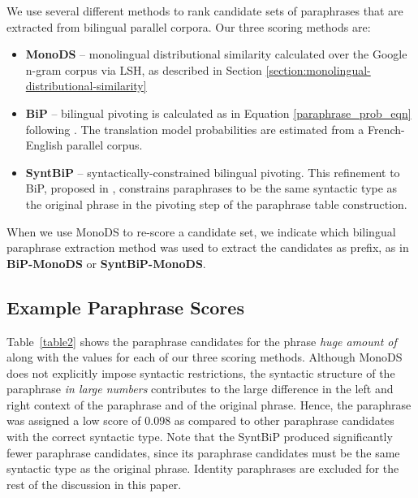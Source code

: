 \documentclass[11pt]{article}
\begin{document}
We use several different methods to rank candidate sets of paraphrases that are extracted from bilingual parallel corpora.  Our three scoring methods are: 
\begin{itemize}
\item {\bf MonoDS} -- monolingual distributional similarity calculated over the Google n-gram corpus via LSH,
 as described in Section \ref{section:monolingual-distributional-similarity}
\vspace{-.2cm}
\item {\bf BiP} -- bilingual pivoting is calculated as in Equation \ref{paraphrase_prob_eqn} following .  The translation model probabilities are estimated from a French-English parallel corpus.
\vspace{-.2cm}
\item {\bf SyntBiP} -- syntactically-constrained bilingual pivoting.  This refinement to BiP, proposed in  , constrains paraphrases to be the same syntactic type as the original phrase in the pivoting step of the paraphrase table construction.
\vspace{-.2cm}
\end{itemize}
When we use MonoDS to re-score a candidate set, we indicate which bilingual paraphrase extraction method was used to extract the candidates as prefix, as in {\bf BiP-MonoDS} or {\bf SyntBiP-MonoDS}.


\subsection{Example Paraphrase Scores}

Table~\ref{table2} shows the paraphrase candidates for the phrase {\em huge amount of} along with the values for each of our three scoring methods. Although MonoDS does not explicitly impose syntactic restrictions, the syntactic structure of the paraphrase {\em in large numbers} contributes to the large difference in the left and right context of the paraphrase and of the original phrase. Hence, the paraphrase was assigned a low score of 0.098 as compared to other paraphrase candidates with the correct syntactic type. Note that the SyntBiP produced significantly fewer paraphrase candidates, since its paraphrase candidates must be the same syntactic type as the original phrase. Identity paraphrases are excluded for the rest of the discussion in this paper.
\end{document}
